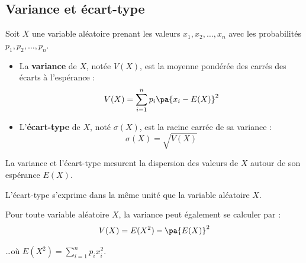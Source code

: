\subsection{Variance et écart-type}

\begin{defin}
	Soit $X$ une variable aléatoire prenant les valeurs $x_1, x_2, \dots, x_n$ avec les probabilités $p_1, p_2, \dots, p_n$.

	\begin{itemize}
		\item La \textbf{variance} de $X$, notée $V(X)$, est la moyenne pondérée des carrés des écarts à l'espérance :
		      \[
			      V(X) = \sum_{i=1}^{n} p_i \pa{x_i - E(X)}^2
		      \]
		\item L'\textbf{écart-type} de $X$, noté $\sigma(X)$, est la racine carrée de sa variance :
		      \[
			      \sigma(X) = \sqrt{V(X)}
		      \]
	\end{itemize}
\end{defin}

\begin{rem}
	La variance et l'écart-type mesurent la dispersion des valeurs de $X$ autour de son espérance $E(X)$.

	L'écart-type s'exprime dans la même unité que la variable aléatoire $X$.
\end{rem}

\begin{theoreme}
	Pour toute variable aléatoire $X$, la variance peut également se calculer par :
	\[
		V(X) = E(X^2) - \pa{E(X)}^2
	\]

	\ldots où $E(X^2) = \displaystyle\sum_{i=1}^{n} p_i x_i^2$.
\end{theoreme}

